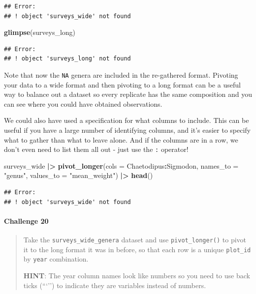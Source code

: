 \documentclass[
  10pt,
  letterpaper,
  twoside,
  openright]{book}
\newenvironment{Shaded}{\begin{snugshade}}{\end{snugshade}}
\newcommand{\AttributeTok}[1]{\textcolor[rgb]{0.13,0.29,0.53}{#1}}
\newcommand{\FunctionTok}[1]{\textcolor[rgb]{0.13,0.29,0.53}{\textbf{#1}}}
\newcommand{\NormalTok}[1]{#1}
\newcommand{\SpecialCharTok}[1]{\textcolor[rgb]{0.81,0.36,0.00}{\textbf{#1}}}
\newcommand{\StringTok}[1]{\textcolor[rgb]{0.31,0.60,0.02}{#1}}
\begin{document}
\begin{verbatim}
## Error:
## ! object 'surveys_wide' not found
\end{verbatim}

\begin{Shaded}
\begin{Highlighting}[]
\FunctionTok{glimpse}\NormalTok{(surveys\_long)}
\end{Highlighting}
\end{Shaded}

\begin{verbatim}
## Error:
## ! object 'surveys_long' not found
\end{verbatim}

Note that now the \texttt{NA} genera are included in the re-gathered
format. Pivoting your data to a wide format and then pivoting to a long
format can be a useful way to balance out a dataset so every replicate
has the same composition and you can see where you could have obtained
observations.

We could also have used a specification for what columns to include.
This can be useful if you have a large number of identifying columns,
and it's easier to specify what to gather than what to leave alone. And
if the columns are in a row, we don't even need to list them all out -
just use the \texttt{:} operator!

\begin{Shaded}
\begin{Highlighting}[]
\NormalTok{surveys\_wide }\SpecialCharTok{|\textgreater{}}
  \FunctionTok{pivot\_longer}\NormalTok{(}\AttributeTok{cols =}\NormalTok{ Chaetodipus}\SpecialCharTok{:}\NormalTok{Sigmodon, }\AttributeTok{names\_to =} \StringTok{"genus"}\NormalTok{, }
               \AttributeTok{values\_to =} \StringTok{"mean\_weight"}\NormalTok{) }\SpecialCharTok{|\textgreater{}}
  \FunctionTok{head}\NormalTok{()}
\end{Highlighting}
\end{Shaded}

\begin{verbatim}
## Error:
## ! object 'surveys_wide' not found
\end{verbatim}

\hypertarget{challenge-20}{%
\paragraph{Challenge 20}\label{challenge-20}}

\begin{quote}
Take the \texttt{surveys\_wide\_genera} dataset and use
\texttt{pivot\_longer()} to pivot it to the long format it was in
before, so that each row is a unique \texttt{plot\_id} by \texttt{year}
combination.

\textbf{HINT}: The year column names look like numbers so you need to
use back ticks (```'') to indicate they are variables instead of
numbers.
\end{quote}
\end{document}
